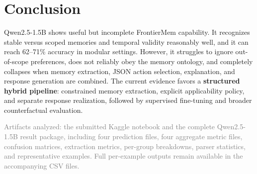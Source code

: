 \documentclass[10pt]{article}
\begin{document}
\section*{Conclusion}
Qwen2.5-1.5B shows useful but incomplete FrontierMem capability. It recognizes stable versus scoped memories and temporal validity reasonably well, and it can reach 62--71\% accuracy in modular settings. However, it struggles to ignore out-of-scope preferences, does not reliably obey the memory ontology, and completely collapses when memory extraction, JSON action selection, explanation, and response generation are combined. The current evidence favors a \textbf{structured hybrid pipeline}: constrained memory extraction, explicit applicability policy, and separate response realization, followed by supervised fine-tuning and broader counterfactual evaluation.

\vfill
{\footnotesize\textcolor{graytext}{Artifacts analyzed: the submitted Kaggle notebook and the complete Qwen2.5-1.5B result package, including four prediction files, four aggregate metric files, confusion matrices, extraction metrics, per-group breakdowns, parser statistics, and representative examples. Full per-example outputs remain available in the accompanying CSV files.}}
\end{document}
